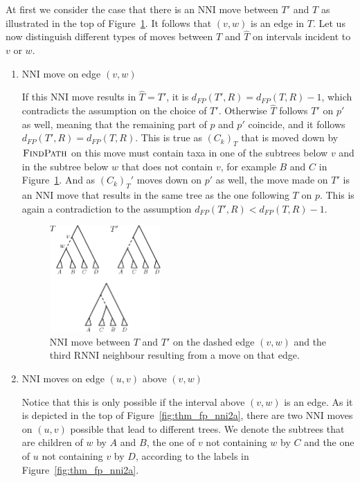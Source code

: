 \documentclass{amsart}
\newcommand{\rnni}{\mathrm{RNNI}}
\newcommand{\findpath}{\textsc{FindPath}}
\newcommand{\nni}{\mathrm{NNI}}
\begin{document}
At first we consider the case that there is an $\nni$ move between $T'$ and $T$ as illustrated in the top of Figure~\ref{fig:thm_fp_nni1}.
It follows that $(v,w)$ is an edge in $T$.
Let us now distinguish different types of moves between $T$ and $\hat T$ on intervals incident to $v$ or $w$.

\begin{enumerate}
    \item $\nni$ move on edge $(v,w)$

    If this $\nni$ move results in $\hat T = T'$, it is $d_{FP}(T',R) = d_{FP}(T,R) - 1$, which contradicts the assumption on the choice of $T'$.
    Otherwise $\hat T$ follows $T'$ on $p'$ as well, meaning that the remaining part of $p$ and $p'$ coincide, and it follows $d_{FP}(T',R) = d_{FP}(T,R)$.
    This is true as $(C_k)_T$ that is moved down by $\findpath$ on this move must contain taxa in one of the subtrees below $v$ and in the subtree below $w$ that does not contain $v$, for example $B$ and $C$ in Figure~\ref{fig:thm_fp_nni1}.
    And as $(C_k)_T'$ moves down on $p'$ as well, the move made on $T'$ is an $\nni$ move that results in the same tree as the one following $T$ on $p$.
    This is again a contradiction to the assumption $d_{FP}(T',R) < d_{FP}(T,R) - 1$.

    \begin{figure}[!hbt]
    \centering
    \includegraphics[width=0.4\textwidth]{thm_fp_nni1}
    \vspace{12pt}
    \caption{$\nni$ move between $T$ and $T'$ on the dashed edge $(v,w)$ and the third $\rnni$ neighbour resulting from a move on that edge.}
    \label{fig:thm_fp_nni1}
    \end{figure}

    \item $\nni$ moves on edge $(u,v)$ above $(v,w)$

    Notice that this is only possible if the interval above $(v,w)$ is an edge.
    As it is depicted in the top of Figure~\ref{fig:thm_fp_nni2a}, there are two $\nni$ moves on $(u,v)$ possible that lead to different trees.
    We denote the subtrees that are children of $w$ by $A$ and $B$, the one of $v$ not containing $w$ by $C$ and the one of $u$ not containing $v$ by $D$, according to the labels in Figure~\ref{fig:thm_fp_nni2a}.


\end{enumerate}
\end{document}
